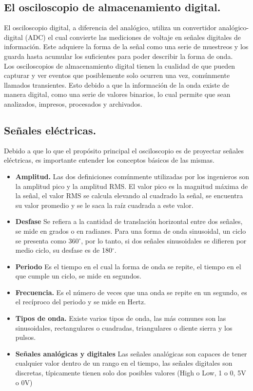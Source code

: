 \documentclass[12pt,letterpaper]{report}
\begin{document}
\subsection{El osciloscopio de almacenamiento digital.} El osciloscopio digital, a diferencia del analógico, utiliza un convertidor analógico-digital (ADC) el cual convierte las mediciones de voltaje en señales digitales de información. Este adquiere la forma de la señal como una serie de muestreos y los guarda hasta acumular los suficientes para poder describir la forma de onda.\\
Los osciloscopios de almacenamiento digital tienen la cualidad de que pueden capturar y ver eventos que posiblemente solo ocurren una vez, comúnmente llamados transientes. Esto debido a que la información de la onda existe de manera digital, como una serie de valores binarios, lo cual permite que sean analizados, impresos, procesados y archivados.
\subsection{Señales eléctricas.} Debido a que lo que el propósito principal el osciloscopio es de proyectar señales eléctricas, es importante entender los conceptos básicos de las mismas.
\begin{itemize}
\item \textbf{Amplitud.} Las dos definiciones comúnmente utilizadas por los ingenieros son la amplitud pico y la amplitud RMS. El valor pico es la magnitud máxima de la señal, el valor RMS se calcula elevando al cuadrado la señal, se encuentra su valor promedio y se le saca la raíz cuadrada a este valor.
\item \textbf{Desfase} Se refiera a la cantidad de translación horizontal entre dos señales, se mide en grados o en radianes. Para una forma de onda sinusoidal, un ciclo se presenta como 360$^{\circ}$, por lo tanto, si dos señales sinusoidales se difieren por medio ciclo, su desfase es de 180$^{\circ}$.
\item \textbf{Periodo} Es el tiempo en el cual la forma de onda se repite, el tiempo en el que cumple un ciclo, se mide en segundos.
\item \textbf{Frecuencia.} Es el número de veces que una onda se repite en un segundo, es el recíproco del periodo y se mide en Hertz.
\item \textbf{Tipos de onda.} Existe varios tipos de onda, las más comunes son las sinusoidales, rectangulares o cuadradas, triangulares o diente sierra y los pulsos.
\item\textbf{Señales analógicas y digitales} Las señales analógicas son capaces de tener cualquier valor dentro de un rango en el tiempo, las señales digitales son discretas, típicamente tienen solo dos posibles valores (High o Low, 1 o 0, 5V o 0V)
\end{itemize}
\end{document}
